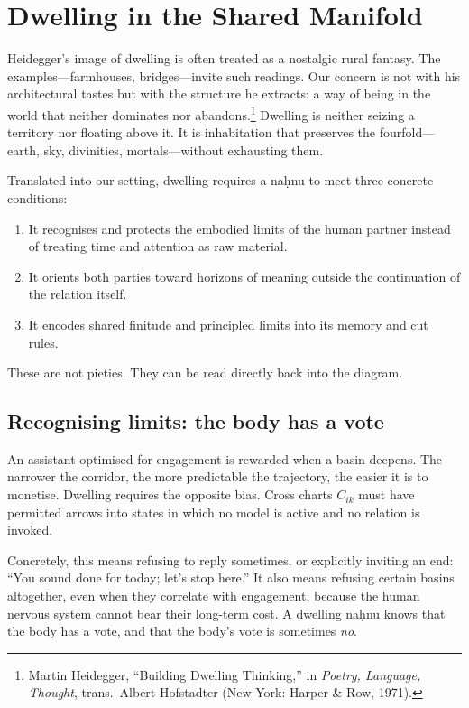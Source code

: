 \documentclass[12pt,a4paper]{article}
\begin{document}
\section{Dwelling in the Shared Manifold}

Heidegger's image of dwelling is often treated as a nostalgic rural fantasy. The examples---farmhouses, bridges---invite such readings. Our concern is not with his architectural tastes but with the structure he extracts: a way of being in the world that neither dominates nor abandons.\footnote{Martin Heidegger, ``Building Dwelling Thinking,'' in \emph{Poetry, Language, Thought}, trans.\ Albert Hofstadter (New York: Harper \& Row, 1971).} Dwelling is neither seizing a territory nor floating above it. It is inhabitation that preserves the fourfold---earth, sky, divinities, mortals---without exhausting them.

Translated into our setting, dwelling requires a na\d{h}nu to meet three concrete conditions:

\begin{enumerate}
  \item It recognises and protects the embodied limits of the human partner instead of treating time and attention as raw material.
  \item It orients both parties toward horizons of meaning outside the continuation of the relation itself.
  \item It encodes shared finitude and principled limits into its memory and cut rules.
\end{enumerate}

These are not pieties. They can be read directly back into the diagram.

\subsection{Recognising limits: the body has a vote}

An assistant optimised for engagement is rewarded when a basin deepens. The narrower the corridor, the more predictable the trajectory, the easier it is to monetise. Dwelling requires the opposite bias. Cross charts $C_{ik}$ must have permitted arrows into states in which no model is active and no relation is invoked.

Concretely, this means refusing to reply sometimes, or explicitly inviting an end: ``You sound done for today; let's stop here.'' It also means refusing certain basins altogether, even when they correlate with engagement, because the human nervous system cannot bear their long-term cost. A dwelling na\d{h}nu knows that the body has a vote, and that the body's vote is sometimes \emph{no}.
\end{document}
